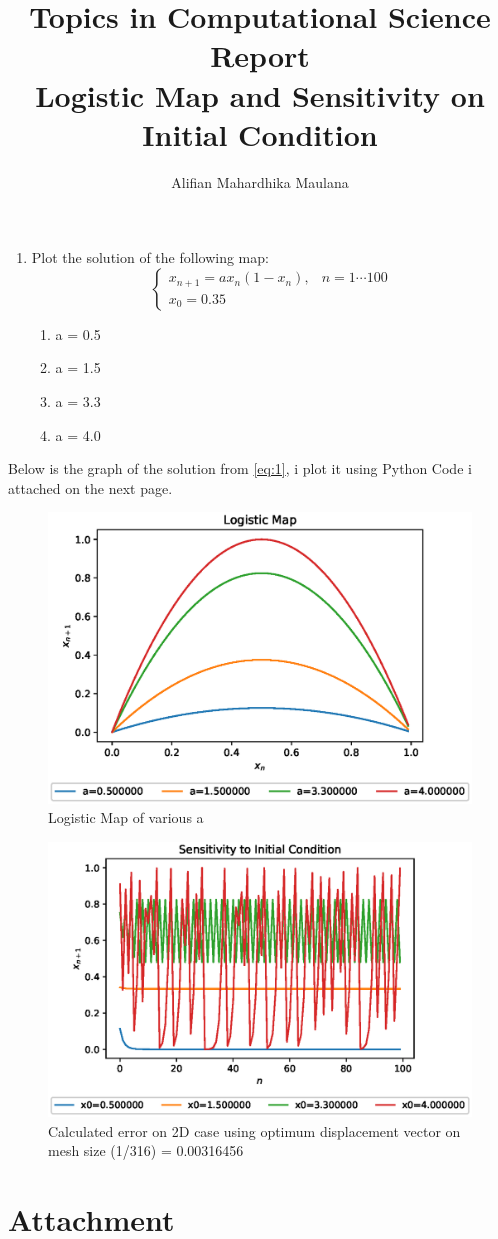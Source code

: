 \documentclass[a4paper,9pt]{article}
\title{Topics in Computational Science Report \\ Logistic Map and Sensitivity on Initial Condition}
\author{Alifian Mahardhika Maulana}
\begin{document}
\maketitle
\begin{enumerate}
	\item Plot the solution of the following map:
	\begin{equation}\label{eq:1}
	\begin{cases}
	x_{n+1} = ax_n(1-x_n), & n = 1\cdots 100\\
	x_0 = 0.35
	\end{cases}
	\end{equation}
	\begin{enumerate}
		\item a = 0.5
		\item a = 1.5
		\item a = 3.3
		\item a = 4.0
	\end{enumerate}
\end{enumerate}
Below is the graph of the solution from \eqref{eq:1}, i plot it using Python Code i attached on the next page.
\begin{figure}[h!]
	\centering
	\includegraphics[width=0.6\linewidth]{picture/logisticmap}
	\caption{Logistic Map of various a}
	\label{fig:logisticmap}
\end{figure}
\begin{figure}[h!]
	\centering
	\includegraphics[width=0.6\linewidth]{picture/sensitivity}
	\caption{Calculated error on 2D case using optimum displacement vector on mesh size (1/316) = 0.00316456}
	\label{fig:sensitivity}
\end{figure}
\section{Attachment}\label{code}

\end{document}
